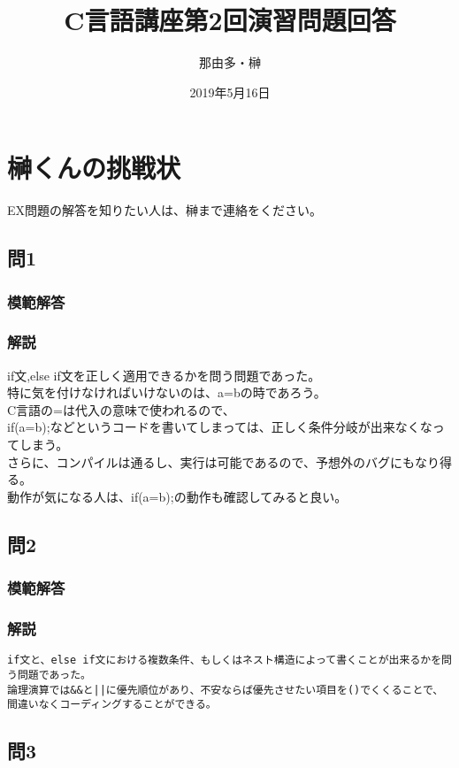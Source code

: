 \documentclass[a4j,titlepage,dvipdfmx]{jsarticle}   %
\title{C言語講座第2回演習問題回答}
\author{那由多・榊}
\date{2019年5月16日}
\newcommand{\codepath}{./code}
\begin{document}
\maketitle
\section{榊くんの挑戦状}
EX問題の解答を知りたい人は、榊まで連絡をください。
\subsection{問1}
\subsubsection{模範解答}

\subsubsection{解説}
if文,else if文を正しく適用できるかを問う問題であった。\\
特に気を付けなければいけないのは、a=bの時であろう。\\
C言語の=は代入の意味で使われるので、\\
if(a=b){;}などというコードを書いてしまっては、正しく条件分岐が出来なくなってしまう。\\
さらに、コンパイルは通るし、実行は可能であるので、予想外のバグにもなり得る。\\
動作が気になる人は、if(a=b){;}の動作も確認してみると良い。\\

\subsection{問2}
\subsubsection{模範解答}

\subsubsection{解説}
\begin{verbatim}
if文と、else if文における複数条件、もしくはネスト構造によって書くことが出来るかを問う問題であった。
論理演算では&&と||に優先順位があり、不安ならば優先させたい項目を()でくくることで、間違いなくコーディングすることができる。
\end{verbatim}
\subsection{問3}
\end{document}
